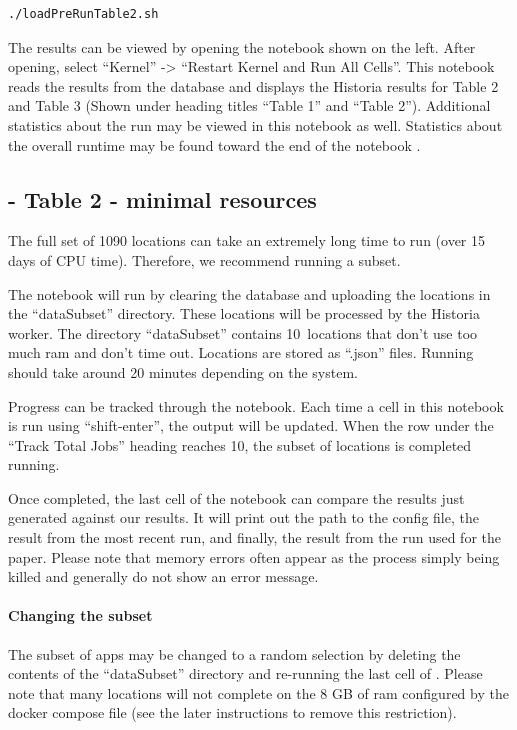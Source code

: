 \documentclass{acmart} %
\begin{document}
\begin{lstlisting}[language=bash]
    ./loadPreRunTable2.sh
\end{lstlisting}

The results can be viewed by opening the notebook  shown on the left.  After opening, select ``Kernel'' -> ``Restart Kernel and Run All Cells''.
This notebook reads the results from the database and displays the Historia results for Table 2 and Table 3 (Shown under heading titles ``Table 1'' and ``Table 2''). Additional statistics about the run may be viewed in this notebook as well. Statistics about the overall runtime may be found toward the end of the notebook .


\subsection{ - Table 2 - minimal resources}

\newcommand{\numsubset}{10}
The full set of 1090 locations can take an extremely long time to run (over 15 days of CPU time).  Therefore, we recommend running a subset.


The notebook  will run by clearing the database and uploading the locations in the ``dataSubset'' directory.  These locations will be processed by the Historia worker.  
The directory ``dataSubset'' contains \numsubset~locations that don't use too much ram and don't time out.  Locations are stored as ``.json'' files.
Running should take around 20 minutes depending on the system.

Progress can be tracked through the  notebook.  
Each time a cell in this notebook is run using ``shift-enter'', the output will be updated.
When the  row under the ``Track Total Jobs'' heading reaches \numsubset, the subset of locations is completed running.

Once completed, the last cell of the notebook  can compare the results just generated against our results.  It will print out the path to the config file, the result from the most recent run, and finally, the result from the run used for the paper.  Please note that memory errors often appear as the process simply being killed and generally do not show an error message.

\paragraph{Changing the subset} The subset of apps may be changed to a random selection by deleting the contents of the ``dataSubset'' directory and re-running the last cell of .  Please note that many locations will not complete on the 8 GB of ram configured by the docker compose file (see the later instructions to remove this restriction).  
\end{document}
